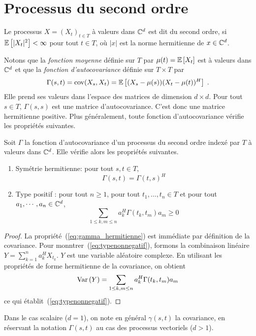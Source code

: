 \section{Processus du second ordre}
\label{sec:stat-second-ordre}


\begin{definition}
Le processus $X=(X_t)_{t \in T}$ \`a valeurs dans $\mathbb{C}^d$ est dit
du second ordre, si ${\mathbb E}\left[ |X_t|^2 \right] < \infty$ pour tout $t\in T$, o\`u $|x|$
est la norme hermitienne de $x\in \mathbb{C}^d$.
\end{definition}
Notons que la \emph{fonction moyenne} d\'efinie sur $T$ par $\mu(t)= {\mathbb E}\left[ X_t \right]$
est \`a valeurs dans $\mathbb{C}^d$ et que la \emph{fonction d'autocovariance}
d\'efinie sur $T\times T$ par
\[
\Gamma(s,t)
   = \mathrm{cov}(X_s,X_t)
   = {\mathbb E}\left[ (X_s - \mu(s))(X_t-\mu(t))^H \right]\;.
\]
Elle prend ses valeurs dans l'espace des matrices de dimension $d\times d$. Pour tout $s\in T$, $\Gamma(s,s)$ est une matrice
d'autocovariance. C'est donc une matrice hermitienne positive. Plus
g\'en\'eralement, toute fonction d'autocovariance v\'erifie les propri\'et\'es
suivantes.

\begin{proposition}
 \label{prop:positifcovgene}
 Soit $\Gamma$ la fonction d'autocovariance d'un processus du second ordre
 index\'e par $T$ \`a valeurs dans $\mathbb{C}^d$. Elle v\'erifie alors les propri\'et\'es
 suivantes.
\begin{enumerate}
\item
Sym\'etrie hermitienne: pour tout $s,t \in T$,
\begin{equation}\label{eq:gamma_hermitienne}
\Gamma(s,t)= \Gamma(t,s)^H
\end{equation}
\item Type positif :
pour tout $n\geq1$, pour tout $t_1,\dots,t_n\in T$ et pour tout
$a_1,\cdots,a_n\in\mathbb{C}^d$,
\begin{equation}
\label{eq:typenonnegatif} \sum_{1 \leq k,m \leq n} a_k^H
 \Gamma(t_k,t_m)a_m \geq 0
\end{equation}
\end{enumerate}
\end{proposition}
\begin{proof}\smartqed
La propri\'et\'e~(\ref{eq:gamma_hermitienne}) est imm\'ediate par d\'efinition de la
covariance.  Pour monntrer~(\ref{eq:typenonnegatif}),
formons la combinaison lin\'eaire $Y= \sum_{k=1}^n a^H_k X_{t_k}$.
$Y$ est une variable al\'eatoire complexe. %
En utilisant les propri\'et\'es de forme hermitienne de la covariance, on obtient
\[
 \mathrm{Var}\left( Y \right)= \sum_{1 \leq k,m \leq n} a_k^H
\Gamma(t_k,t_m)a_m
\]
ce qui \'etablit~(\ref{eq:typenonnegatif}).

\end{proof}
Dans le cas scalaire ($d = 1$), on note en g\'en\'eral $\gamma(s,t)$
la covariance, en r\'eservant la notation $\Gamma(s,t)$ au cas des
processus vectoriels ($d > 1$).

